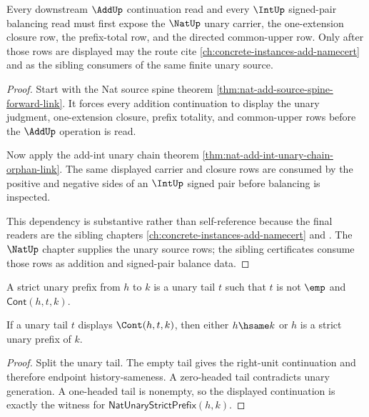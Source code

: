 \begin{theorem}
\label{thm:nat-orphan-add-dependency-route}
Every downstream $\AddUp$ continuation read and every $\IntUp$ signed-pair
balancing read must first expose the $\NatUp$ unary carrier, the one-extension
closure row, the prefix-total row, and the directed common-upper row. Only after
those rows are displayed may the route cite
\autoref{ch:concrete-instances-add-namecert} and
 as the sibling consumers of the
same finite unary source.
\end{theorem}
\begin{proof}
Start with the Nat source spine theorem
\autoref{thm:nat-add-source-spine-forward-link}. It forces every addition
continuation to display the unary judgment, one-extension closure, prefix
totality, and common-upper rows before the $\AddUp$ operation is read.

Now apply the add-int unary chain theorem
\autoref{thm:nat-add-int-unary-chain-orphan-link}. The same displayed carrier
and closure rows are consumed by the positive and negative sides of an $\IntUp$
signed pair before balancing is inspected.

This dependency is substantive rather than self-reference because the final
readers are the sibling chapters \autoref{ch:concrete-instances-add-namecert}
and . The $\NatUp$ chapter supplies
the unary source rows; the sibling certificates consume those rows as addition
and signed-pair balance data.
\end{proof}

\begin{definition}
\label{def:nat-unary-strict-prefix}
A strict unary prefix from $h$ to $k$ is a unary tail $t$ such that $t$ is not
$\emp$ and $\mathsf{Cont}(h,t,k)$.
\end{definition}

\begin{lemma}
\label{lem:nat-unary-prefix-cont-tail-cases}
If a unary tail \(t\) displays \(\Cont(h,t,k)\), then either \(h\hsame k\) or \(h\) is a strict unary prefix of \(k\).
\end{lemma}
\begin{proof}
Split the unary tail. The empty tail gives the right-unit continuation and therefore endpoint history-sameness. A zero-headed tail contradicts unary generation. A one-headed tail is nonempty, so the displayed continuation is exactly the witness for \(\mathsf{NatUnaryStrictPrefix}(h,k)\).
\end{proof}

